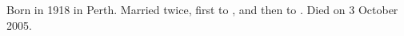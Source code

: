 
Born in 1918 in Perth.\cite{BruceWilsonBirth}
Married twice, first to , and then to .
Died on 3 October 2005.
